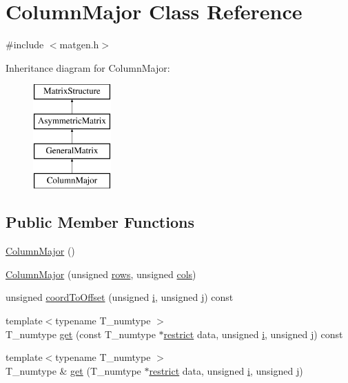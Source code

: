 \hypertarget{classColumnMajor}{}\section{Column\+Major Class Reference}
\label{classColumnMajor}


{\ttfamily \#include $<$matgen.\+h$>$}

Inheritance diagram for Column\+Major\+:\begin{figure}[H]
\begin{center}
\leavevmode
\includegraphics[height=4.000000cm]{classColumnMajor}
\end{center}
\end{figure}
\subsection*{Public Member Functions}
\begin{DoxyCompactItemize}
\item 
\hyperlink{classColumnMajor_a240089521d22727e96c150e8342ef8fa}{Column\+Major} ()
\item 
\hyperlink{classColumnMajor_a6438127d17cb19d17fab881d4d691057}{Column\+Major} (unsigned \hyperlink{classAsymmetricMatrix_adf8ff298b6b24882a147fdcedebe1bbd}{rows}, unsigned \hyperlink{classAsymmetricMatrix_a5ef0ec381e4d33a1f19be7c3e26410d4}{cols})
\item 
unsigned \hyperlink{classColumnMajor_ad0215be1e1af3ec4df605bb2b43fe2c6}{coord\+To\+Offset} (unsigned \hyperlink{indexexpr_8h_aabd77643995707c185e95c8cb2782c81}{i}, unsigned \hyperlink{indexexpr_8h_aa1f3325d66516548e69238097857fa98}{j}) const 
\item 
{\footnotesize template$<$typename T\+\_\+numtype $>$ }\\T\+\_\+numtype \hyperlink{classColumnMajor_a0e7767770033a03f417e6d2a946166f0}{get} (const T\+\_\+numtype $\ast$\hyperlink{compiler_8h_a080abdcb9c02438f1cd2bb707af25af8}{restrict} data, unsigned \hyperlink{indexexpr_8h_aabd77643995707c185e95c8cb2782c81}{i}, unsigned \hyperlink{indexexpr_8h_aa1f3325d66516548e69238097857fa98}{j}) const 
\item 
{\footnotesize template$<$typename T\+\_\+numtype $>$ }\\T\+\_\+numtype \& \hyperlink{classColumnMajor_a79e3b4c6f4fb934f64951d32c8225c09}{get} (T\+\_\+numtype $\ast$\hyperlink{compiler_8h_a080abdcb9c02438f1cd2bb707af25af8}{restrict} data, unsigned \hyperlink{indexexpr_8h_aabd77643995707c185e95c8cb2782c81}{i}, unsigned \hyperlink{indexexpr_8h_aa1f3325d66516548e69238097857fa98}{j})
\end{DoxyCompactItemize}
